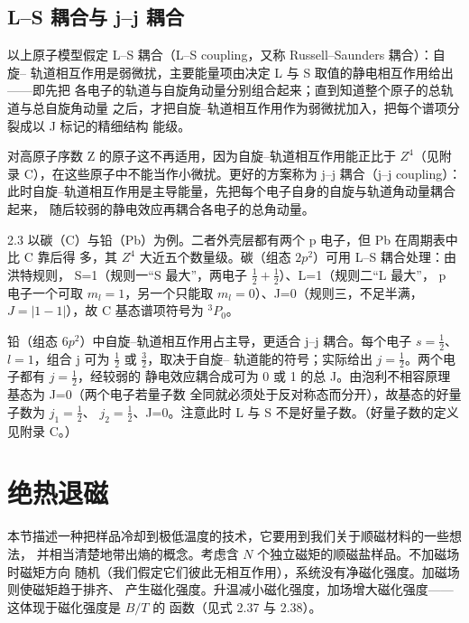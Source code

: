 \subsection{L--S 耦合与 j--j 耦合}

以上原子模型假定 L--S 耦合（L--S coupling，又称 Russell--Saunders 耦合）：自旋--
轨道相互作用是弱微扰，主要能量项由决定 L 与 S 取值的静电相互作用给出——即先把
各电子的轨道与自旋角动量分别组合起来；直到知道整个原子的总轨道与总自旋角动量
之后，才把自旋--轨道相互作用作为弱微扰加入，把每个谱项分裂成以 J 标记的精细结构
能级。

对高原子序数 Z 的原子这不再适用，因为自旋--轨道相互作用能正比于
$Z^{4}$（见附录 C），在这些原子中不能当作小微扰。更好的方案称为 j--j 耦合（j--j coupling）：
此时自旋--轨道相互作用是主导能量，先把每个电子自身的自旋与轨道角动量耦合起来，
随后较弱的静电效应再耦合各电子的总角动量。

\begin{example}{2.3}
以碳（C）与铅（Pb）为例。二者外壳层都有两个 p 电子，但 Pb 在周期表中比 C 靠后得
多，其 $Z^{4}$ 大近五个数量级。碳（组态 $2p^{2}$）可用 L--S 耦合处理：由洪特规则，
S=1（规则一“S 最大”，两电子 $\frac{1}{2}+\frac{1}{2}$）、L=1（规则二“L 最大”，
p 电子一个可取 $m_l=1$，另一个只能取 $m_l=0$）、J=0（规则三，不足半满，
$J=|1-1|$），故 C 基态谱项符号为 ${}^{3}P_{0}$。

铅（组态 $6p^{2}$）中自旋--轨道相互作用占主导，更适合 j--j 耦合。每个电子
$s=\frac{1}{2}$、$l=1$，组合 j 可为 $\frac{1}{2}$ 或 $\frac{3}{2}$，取决于自旋--
轨道能的符号；实际给出 $j=\frac{1}{2}$。两个电子都有 $j=\frac{1}{2}$，经较弱的
静电效应耦合成可为 0 或 1 的总 J。由泡利不相容原理基态为 J=0（两个电子若量子数
全同就必须处于反对称态而分开），故基态的好量子数为 $j_1=\frac{1}{2}$、
$j_2=\frac{1}{2}$、J=0。注意此时 L 与 S 不是好量子数。（好量子数的定义见附录 C。）
\end{example}

\section{绝热退磁}

本节描述一种把样品冷却到极低温度的技术，它要用到我们关于顺磁材料的一些想法，
并相当清楚地带出熵的概念。考虑含 $N$ 个独立磁矩的顺磁盐样品。不加磁场时磁矩方向
随机（我们假定它们彼此无相互作用），系统没有净磁化强度。加磁场则使磁矩趋于排齐、
产生磁化强度。升温减小磁化强度，加场增大磁化强度——这体现于磁化强度是 $B/T$ 的
函数（见式 2.37 与 2.38）。


